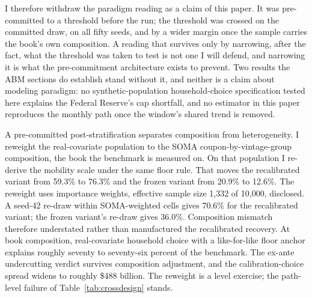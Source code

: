 \documentclass[12pt]{article}
\begin{document}
I therefore withdraw the paradigm reading as a claim of this paper. It was pre-committed to a threshold before the run; the threshold was crossed on the committed draw, on all fifty seeds, and by a wider margin once the sample carries the book's own composition. A reading that survives only by narrowing, after the fact, what the threshold was taken to test is not one I will defend, and narrowing it is what the pre-commitment architecture exists to prevent. Two results the ABM sections do establish stand without it, and neither is a claim about modeling paradigm: no synthetic-population household-choice specification tested here explains the Federal Reserve's cap shortfall, and no estimator in this paper reproduces the monthly path once the window's shared trend is removed.

A pre-committed post-stratification separates composition from heterogeneity. I reweight the real-covariate population to the SOMA coupon-by-vintage-group composition, the book the benchmark is measured on. On that population I re-derive the mobility scale under the same floor rule. That moves the recalibrated variant from 59.3\% to 76.3\% and the frozen variant from 20.9\% to 12.6\%. The reweight uses importance weights, effective sample size 1{,}332 of 10{,}000, disclosed. A seed-42 re-draw within SOMA-weighted cells gives 70.6\% for the recalibrated variant; the frozen variant's re-draw gives 36.0\%. Composition mismatch therefore understated rather than manufactured the recalibrated recovery. At book composition, real-covariate household choice with a like-for-like floor anchor explains roughly seventy to seventy-six percent of the benchmark. The ex-ante undercutting verdict survives composition adjustment, and the calibration-choice spread widens to roughly \$488 billion. The reweight is a level exercise; the path-level failure of Table~\ref{tab:crossdesign} stands.
\end{document}
